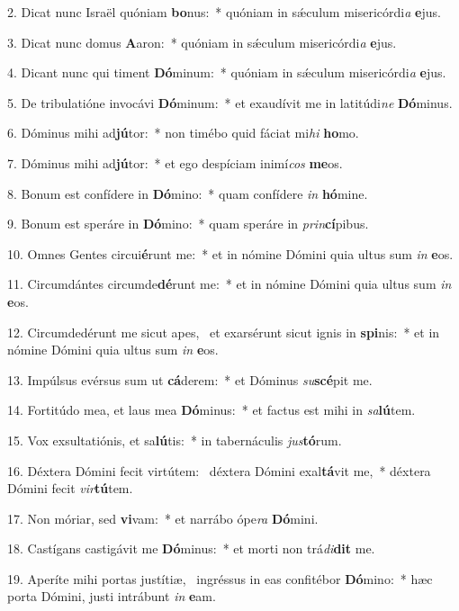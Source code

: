 2. Dicat nunc Israël quóniam \textbf{bo}nus:~*  quóniam in sǽculum misericórdi\textit{a} \textbf{e}jus.\

3. Dicat nunc domus \textbf{A}aron:~*  quóniam in sǽculum misericórdi\textit{a} \textbf{e}jus.\

4. Dicant nunc qui timent \textbf{Dó}minum:~*  quóniam in sǽculum misericórdi\textit{a} \textbf{e}jus.\

5. De tribulatióne invocávi \textbf{Dó}minum:~*  et exaudívit me in latitúdi\textit{ne} \textbf{Dó}minus.\

6. Dóminus mihi ad\textbf{jú}tor:~*  non timébo quid fáciat mi\textit{hi} \textbf{ho}mo.\

7. Dóminus mihi ad\textbf{jú}tor:~*  et ego despíciam inimí\textit{cos} \textbf{me}os.\

8. Bonum est confídere in \textbf{Dó}mino:~*  quam confídere \textit{in} \textbf{hó}mine.\

9. Bonum est speráre in \textbf{Dó}mino:~*  quam speráre in \textit{prin}\textbf{cí}pibus.\

10. Omnes Gentes circui\textbf{é}runt me:~*  et in nómine Dómini quia ultus sum \textit{in} \textbf{e}os.\

11. Circumdántes circumde\textbf{dé}runt me:~*  et in nómine Dómini quia ultus sum \textit{in} \textbf{e}os.\

12. Circumdedérunt me sicut apes, \dag\  et exarsérunt sicut ignis in \textbf{spi}nis:~*  et in nómine Dómini quia ultus sum \textit{in} \textbf{e}os.\

13. Impúlsus evérsus sum ut \textbf{cá}derem:~*  et Dóminus \textit{su}\textbf{scé}pit me.\

14. Fortitúdo mea, et laus mea \textbf{Dó}minus:~*  et factus est mihi in \textit{sa}\textbf{lú}tem.\

15. Vox exsultatiónis, et sa\textbf{lú}tis:~*  in tabernáculis \textit{jus}\textbf{tó}rum.\

16. Déxtera Dómini fecit virtútem: \dag\  déxtera Dómini exal\textbf{tá}vit me,~*  déxtera Dómini fecit \textit{vir}\textbf{tú}tem.\

17. Non móriar, sed \textbf{vi}vam:~*  et narrábo ópe\textit{ra} \textbf{Dó}mini.\

18. Castígans castigávit me \textbf{Dó}minus:~*  et morti non trá\textit{di}\textbf{dit} me.\

19. Aperíte mihi portas justítiæ, \dag\  ingréssus in eas confitébor \textbf{Dó}mino:~*  hæc porta Dómini, justi intrábunt \textit{in} \textbf{e}am.\

